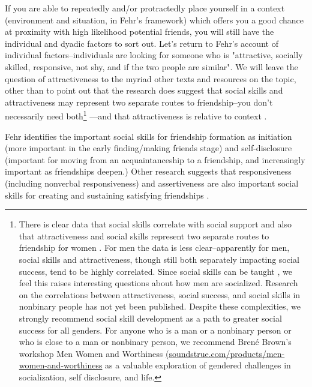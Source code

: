 \documentclass[12pt,letterpaper]{book}
\begin{document}
If you are able to repeatedly and/or protractedly place yourself in a context (environment and situation, in Fehr's framework) which offers you a good chance at proximity with high likelihood potential friends, you will still have the individual and dyadic factors to sort out. Let's return to Fehr's account of individual factors–individuals are looking for someone who is "attractive, socially skilled, responsive, not shy, and if the two people are similar". We will leave the question of attractiveness to the myriad other texts and resources on the topic, other than to point out that the research does suggest that social skills and attractiveness may represent two separate routes to friendship–you don't necessarily need both\footnote{There is clear data that social skills correlate with social support \cite{sarason1985concomitants} and also that attractiveness and social skills represent two separate routes to friendship for women \cite{reis1982physical}. For men the data is less clear–apparently for men, social skills and attractiveness, though still both separately impacting social success, tend to be highly correlated. Since social skills can be taught \cite{brigman1999teaching,sazak2013outcomes}, we feel this raises interesting questions about how men are socialized. Research on the correlations between attractiveness, social success, and social skills in nonbinary people has not yet been published. Despite these complexities, we strongly recommend social skill development as a path to greater social success for all genders. For anyone who is a man or a nonbinary person or who is close to a man or nonbinary person, we recommend Bren{\'e} Brown's workshop Men Women and Worthiness \href{soundstrue.com/products/men-women-and-worthiness}{(soundstrue.com/products/men-women-and-worthiness} as a valuable exploration of gendered challenges in socialization, self disclosure, and life.} —and that attractiveness is relative to context \cite{geiselman1984context,melamed1975effect,little2011facial,moss1975effects,lei2020contrast}.
 
Fehr identifies the important social skills for friendship formation as initiation (more important in the early finding/making friends stage) and self-disclosure (important for moving from an acquaintanceship to a friendship, and increasingly important as friendships deepen.) Other research suggests that responsiveness (including nonverbal responsiveness) and assertiveness are also important social skills for creating and sustaining satisfying friendships \cite{riggio1986assessment}.
\end{document}
